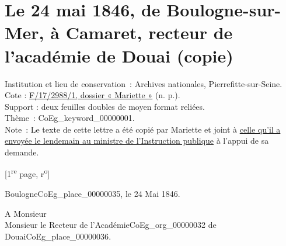 \documentclass{book}
\begin{document}
\section*{Le 24 mai 1846, de Boulogne-sur-Mer, à Camaret, recteur de l’académie de Douai (copie)}
 \label{labCoEg_Mariette_1846-05-24}
{\footnotesize
\noindent Institution et lieu de conservation~: Archives nationales, Pierrefitte-sur-Seine.\\
Cote : \hyperlink{CoEg_Mariette_ms_002}{F/17/2988/1, dossier « Mariette »} (n. p.).\\
Support : deux feuilles doubles de moyen format reliées.\\
Thème~: \gls{CoEg_keyword_00000001}.\\
Note~: Le texte de cette lettre a été copié par Mariette et joint à \hyperlink{CoEg_Mariette_1846-05-25}{celle qu'il a envoyée le lendemain au ministre de l’Instruction publique} à l’appui de sa demande.}

{\footnotesize \begin{center} {[1\textsuperscript{re} page, r\textsuperscript{o}]}\end{center}}
\begin{flushright}Boulogne\gls{CoEg_place_00000035}, le 24 Mai 1846.\end{flushright}
\par A Monsieur\\
\indent \hspace{1cm}Monsieur le Recteur de l’Académie\gls{CoEg_org_00000032} de Douai\gls{CoEg_place_00000036}.\\
\end{document}
